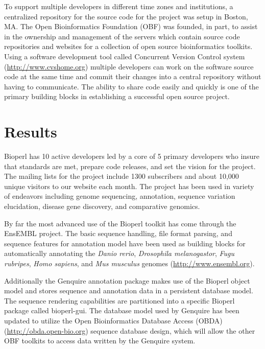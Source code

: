 \documentclass[12pt]{article}
\begin{document}
To support multiple developers in different time zones and
institutions, a centralized repository for the source code for the
project was setup in Boston, MA.  The Open Bioinformatics Foundation
(OBF) was founded, in part, to assist in the ownership and management
of the servers which contain source code repositories and websites for
a collection of open source bioinformatics toolkits.  Using a software
development tool called Concurrent Version Control system
(\url{http://www.cvshome.org}) \cite{cvsbook} multiple developers can work on the software source
code at the same time and commit their changes into a central
repository without having to communicate.  The ability to share code
easily and quickly is one of the primary building blocks in
establishing a successful open source project.

\section{Results}

Bioperl has 10 active developers led by a core of 5 primary developers
who insure that standards are met, prepare code releases, and set the
vision for the project.  The mailing lists for the project include
1300 subscribers and about 10,000 unique visitors to our website each
month.  The project has been used in variety of endeavors including
genome sequencing, annotation, sequence variation elucidation, disease
gene discovery, and comparative genomics.

By far the most advanced use of the Bioperl toolkit has come through
the EnsEMBL\cite{ensembl-nar} project.  The basic sequence handling,
file format parsing, and sequence features for annotation model have
been used as building blocks for automatically annotating the
\textit{Danio rerio}, \textit{Drosophila melanogastor}, \textit{Fugu
rubripes}, \textit{Homo sapiens}, and \textit{Mus musculus} genomes (\url{http://www.ensembl.org}).

Additionally the Genquire\cite{genquire} annotation package makes use
of the Bioperl object model and stores sequence and annotation data in
a persistent database model.  The sequence rendering capabilities are
partitioned into a specific Bioperl package called bioperl-gui.  The
database model used by Genquire has been updated to utilize the
Open Bioinformatics Database Access (OBDA) (\url{http://obda.open-bio.org}) sequence database design, which
will allow the other OBF toolkits to access data written by the
Genquire system.
\end{document}
